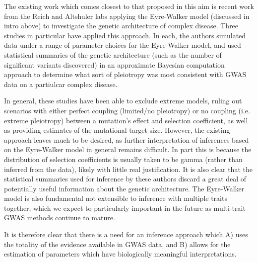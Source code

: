 \documentclass[11pt]{article}
\begin{document}
The existing work which comes closest to that proposed in this aim is recent work from the Reich and Altshuler labs applying the Eyre-Walker model (discussed in intro above) to investigate the genetic architecture of complex disease. Three studies in particular have applied this approach\cite{Agarwala:2013bu, Fuchsberger:2016df,Mancuso:2015cp}. In each, the authors simulated data under a range of parameter choices for the Eyre-Walker model, and used statistical summaries of the genetic architecture (such as the number of significant variants discovered) in an approximate Bayesian computation approach to determine what sort of pleiotropy was most consistent with GWAS data on a partiulcar complex disease.

In general, these studies have been able to exclude extreme models, ruling out scenarios with either perfect coupling (limited/no pleiotropy) or no coupling (i.e. extreme pleiotropy) between a mutation's effect and selection coefficient, as well as providing estimates of the mutational target size. However, the existing approach leaves much to be desired, as further interpretation of inferences based on the Eyre-Walker model in general remains difficult. In part this is because the distribution of selection coefficients is usually taken to be gamma (rather than inferred from the data), likely with little real justification\cite{EyreWalker:2007dl,Racimo:2014cb}. It is also clear that the statistical summaries used for inference by these authors discard a great deal of potentially useful information about the genetic architecture. The Eyre-Walker model is also fundamental not extensible to inference with multiple traits together, which we expect to particularly important in the future as multi-trait GWAS methods continue to mature.\cite{PickrellPairwise,SomeMatthewStephensPaper}

It is therefore clear that there is a need for an inference approach which A) uses the totality of the evidence available in GWAS data, and B) allows for the estimation of parameters which have biologically meaningful interpretations. 
\end{document}
